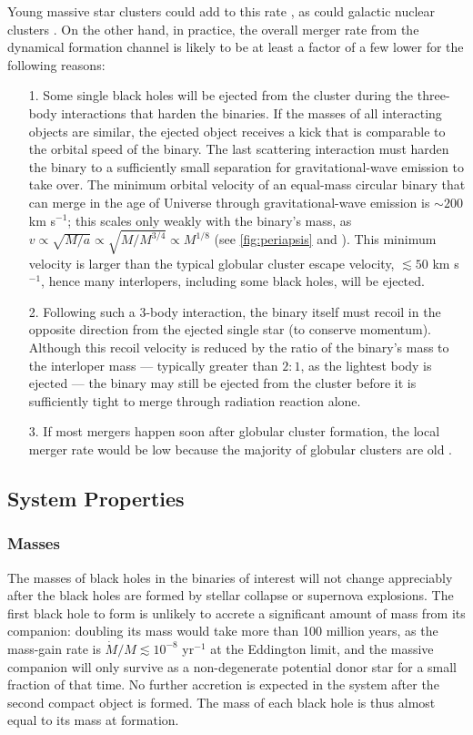 \documentclass[iop,onecolumn]{revtex4}
\begin{document}
Young massive star clusters could add to this rate \citep[e.g.,][]{Ziosi:2014}, as could galactic nuclear clusters \citep[e.g.,][]{MillerLauburg:2008,Bartos:2016,Stone:2016,AntoniniRasio:2016}.  On the other hand, in practice, the overall merger rate from the dynamical formation channel is likely to be at least a factor of a few lower for the following reasons:
\begin{enumerate}
	\item [1.]
Some single black holes will be ejected from the cluster during the three-body interactions that harden the binaries.  If the masses of all interacting objects are similar, the ejected object receives a kick that is comparable to the orbital speed of the binary.  The last scattering interaction must harden the binary to a sufficiently small separation for gravitational-wave emission to take over. The minimum orbital velocity of an equal-mass circular binary that can merge in the age of Universe through gravitational-wave emission is $\sim 200$ km s$^{-1}$; this scales only weakly with the binary's mass, as $v \propto \sqrt{M/a}  \propto \sqrt{M/M^{3/4}} \propto M^{1/8}$ (see \autoref{fig:periapsis} and \citet{Peters:1964}).   This minimum velocity is larger than the typical globular cluster escape velocity, $\lesssim 50$ km s$^{-1}$, hence many interlopers, including some black holes, will be ejected.
	\item[2.]
Following such a 3-body interaction, the binary itself must recoil in the opposite direction from the ejected single star (to conserve momentum). Although this recoil velocity is reduced by the ratio of the binary's mass to the interloper mass --- typically greater than $2:1$, as the lightest body is ejected --- the binary may still be ejected from the cluster before it is sufficiently tight to merge through radiation reaction alone.
\item[3.] If most mergers happen soon after globular cluster formation, the local merger rate would be low because the majority of globular clusters are old \citep{Rodriguez:2016big}.
\end{enumerate} 

\subsection{System Properties}
\subsubsection{Masses}
The masses of black holes in the binaries of interest will not change appreciably after the black holes are formed by stellar collapse or supernova explosions.  The first black hole to form is unlikely to accrete a significant amount of mass from its companion: doubling its mass would take more than 100 million years, as the mass-gain rate is $\dot{M}/M \lesssim 10^{-8}$ yr$^{-1}$ at the Eddington limit, and the massive companion will only survive as a non-degenerate potential donor star for a small fraction of that time. No further accretion is expected in the system after the second compact object is formed. The mass of each black hole is thus almost equal to its mass at formation. 
\end{document}
